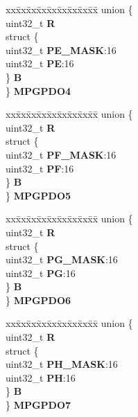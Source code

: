 \begin{DoxyCompactItemize}
\begin{tabbing}
\end{tabbing}\item 
\mbox{\label{structSIU__tag_a59d8edde5926d297ceb49df7667174b9}} 
\begin{tabbing}
xx\=xx\=xx\=xx\=xx\=xx\=xx\=xx\=xx\=\kill
union \{\\
\>uint32\_t {\bfseries R}\\
\>struct \{\\
\>\>uint32\_t {\bfseries PE\_MASK}:16\\
\>\>uint32\_t {\bfseries PE}:16\\
\>\} {\bfseries B}\\
\} {\bfseries MPGPDO4}\\

\end{tabbing}\item 
\mbox{\label{structSIU__tag_a18cfc76808172c557f58aac453dfd0a0}} 
\begin{tabbing}
xx\=xx\=xx\=xx\=xx\=xx\=xx\=xx\=xx\=\kill
union \{\\
\>uint32\_t {\bfseries R}\\
\>struct \{\\
\>\>uint32\_t {\bfseries PF\_MASK}:16\\
\>\>uint32\_t {\bfseries PF}:16\\
\>\} {\bfseries B}\\
\} {\bfseries MPGPDO5}\\

\end{tabbing}\item 
\mbox{\label{structSIU__tag_aacf14ceefb5894571ec2e2294cfe22ac}} 
\begin{tabbing}
xx\=xx\=xx\=xx\=xx\=xx\=xx\=xx\=xx\=\kill
union \{\\
\>uint32\_t {\bfseries R}\\
\>struct \{\\
\>\>uint32\_t {\bfseries PG\_MASK}:16\\
\>\>uint32\_t {\bfseries PG}:16\\
\>\} {\bfseries B}\\
\} {\bfseries MPGPDO6}\\

\end{tabbing}\item 
\mbox{\label{structSIU__tag_a52b15682b412de65babe1487a203f75e}} 
\begin{tabbing}
xx\=xx\=xx\=xx\=xx\=xx\=xx\=xx\=xx\=\kill
union \{\\
\>uint32\_t {\bfseries R}\\
\>struct \{\\
\>\>uint32\_t {\bfseries PH\_MASK}:16\\
\>\>uint32\_t {\bfseries PH}:16\\
\>\} {\bfseries B}\\
\} {\bfseries MPGPDO7}\\


\end{tabbing}
\end{DoxyCompactItemize}
